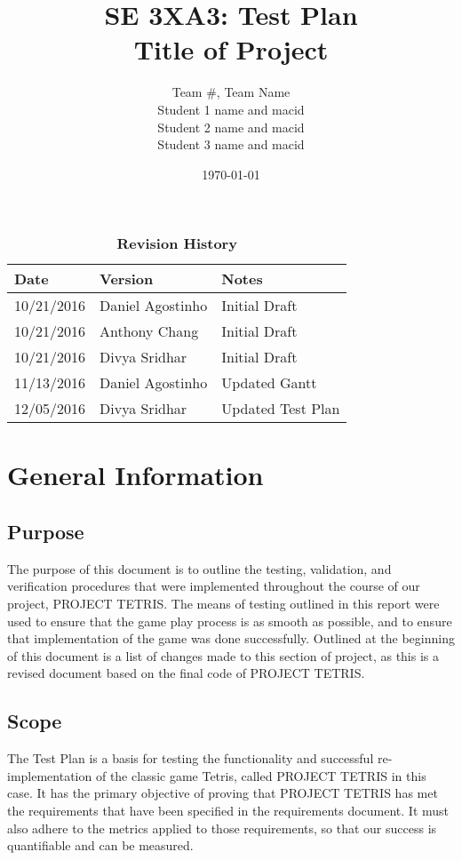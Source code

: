 \documentclass[12pt, titlepage]{article}
\title{SE 3XA3: Test Plan\\Title of Project}
\author{Team \#, Team Name
		\\ Student 1 name and macid
		\\ Student 2 name and macid
		\\ Student 3 name and macid
}
\date{\today}
\begin{document}
\maketitle

\tableofcontents
\listoftables
\listoffigures

\begin{table}[!h]
\caption{\bf Revision History}
\begin{tabularx}{\textwidth}{p{3cm}p{2cm}X}
\toprule {\bf Date} & {\bf Version} & {\bf Notes}\\
\midrule
10/21/2016 & Daniel Agostinho & Initial Draft\\
10/21/2016 & Anthony Chang & Initial Draft\\
10/21/2016 & Divya Sridhar & Initial Draft\\
11/13/2016 & Daniel Agostinho & Updated Gantt\\
12/05/2016 & Divya Sridhar & Updated Test Plan\\
\bottomrule
\end{tabularx}
\end{table}

\newpage



\section{General Information}
\subsection{Purpose}
The purpose of this document is to outline the testing, validation, and verification procedures that were implemented throughout the course of our project, PROJECT TETRIS. The means of testing outlined in this report were used to ensure that the game play process is as smooth as possible, and to ensure that implementation of the game was done successfully. Outlined at the beginning of this document is a list of changes made to this section of project, as this is a revised document based on the final code of PROJECT TETRIS.
\subsection{Scope}
The Test Plan is a basis for testing the functionality and successful re-implementation of the classic game Tetris, called PROJECT TETRIS in this case. It has the primary objective of proving that PROJECT TETRIS has met the requirements that have been specified in the requirements document. It must also adhere to the metrics applied to those requirements, so that our success is quantifiable and can be measured.
\end{document}
